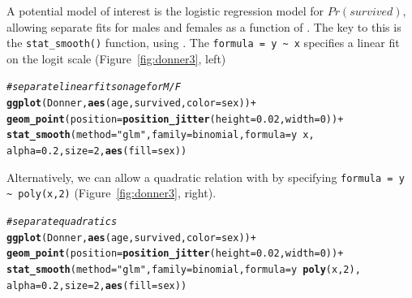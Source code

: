 \documentclass[10pt,twoside]{article}\usepackage[]{graphicx}\usepackage[]{color}
\makeatletter
\newcommand{\hlnum}[1]{\textcolor[rgb]{0.686,0.059,0.569}{#1}}%
\newcommand{\hlstr}[1]{\textcolor[rgb]{0.192,0.494,0.8}{#1}}%
\newcommand{\hlcom}[1]{\textcolor[rgb]{0.678,0.584,0.686}{\textit{#1}}}%
\newcommand{\hlopt}[1]{\textcolor[rgb]{0,0,0}{#1}}%
\newcommand{\hlstd}[1]{\textcolor[rgb]{0.345,0.345,0.345}{#1}}%
\newcommand{\hlkwc}[1]{\textcolor[rgb]{0.333,0.667,0.333}{#1}}%
\newcommand{\hlkwd}[1]{\textcolor[rgb]{0.737,0.353,0.396}{\textbf{#1}}}%
\newenvironment{kframe}{%
 \def\at@end@of@kframe{}%
 \ifinner\ifhmode%
  \def\at@end@of@kframe{\end{minipage}}%
  \begin{minipage}{\columnwidth}%
 \fi\fi%
 \def\FrameCommand##1{\hskip\@totalleftmargin \hskip-\fboxsep
 \colorbox{shadecolor}{##1}\hskip-\fboxsep
     \hskip-\linewidth \hskip-\@totalleftmargin \hskip\columnwidth}%
 \MakeFramed {\advance\hsize-\width
   \@totalleftmargin\z@ \linewidth\hsize
   \@setminipage}}%
 {\par\unskip\endMakeFramed%
 \at@end@of@kframe}
\newenvironment{knitrout}{}{} %
\newcommand{\figref}[1]{Figure~\ref{#1}}
\makeatother
\begin{document}
A potential model of interest
is the logistic regression model for $Pr(survived)$, allowing separate
fits for males and females as a function of .
The key to this is the \verb|stat_smooth()| function, using
	. The \verb|formula = y ~ x|
	specifies a linear fit on the logit scale (\figref{fig:donner3}, left)

\begin{knitrout}
\color{fgcolor}\begin{kframe}
\begin{alltt}
\hlcom{# separate linear fits on age for M/F}
\hlkwd{ggplot}\hlstd{(Donner,} \hlkwd{aes}\hlstd{(age, survived,} \hlkwc{color} \hlstd{= sex))} \hlopt{+}
  \hlkwd{geom_point}\hlstd{(}\hlkwc{position} \hlstd{=} \hlkwd{position_jitter}\hlstd{(}\hlkwc{height} \hlstd{=} \hlnum{0.02}\hlstd{,} \hlkwc{width} \hlstd{=} \hlnum{0}\hlstd{))} \hlopt{+}
  \hlkwd{stat_smooth}\hlstd{(}\hlkwc{method} \hlstd{=} \hlstr{"glm"}\hlstd{,} \hlkwc{family} \hlstd{= binomial,} \hlkwc{formula} \hlstd{= y} \hlopt{~} \hlstd{x,}
           \hlkwc{alpha} \hlstd{=} \hlnum{0.2}\hlstd{,} \hlkwc{size}\hlstd{=}\hlnum{2}\hlstd{,} \hlkwd{aes}\hlstd{(}\hlkwc{fill} \hlstd{= sex))}
\end{alltt}
\end{kframe}
\end{knitrout}

Alternatively, we can allow a quadratic relation with 
by specifying \verb|formula = y ~ poly(x,2)| (\figref{fig:donner3}, right).
\begin{knitrout}
\color{fgcolor}\begin{kframe}
\begin{alltt}
\hlcom{# separate quadratics}
\hlkwd{ggplot}\hlstd{(Donner,} \hlkwd{aes}\hlstd{(age, survived,} \hlkwc{color} \hlstd{= sex))} \hlopt{+}
  \hlkwd{geom_point}\hlstd{(}\hlkwc{position} \hlstd{=} \hlkwd{position_jitter}\hlstd{(}\hlkwc{height} \hlstd{=} \hlnum{0.02}\hlstd{,} \hlkwc{width} \hlstd{=} \hlnum{0}\hlstd{))} \hlopt{+}
  \hlkwd{stat_smooth}\hlstd{(}\hlkwc{method} \hlstd{=} \hlstr{"glm"}\hlstd{,} \hlkwc{family} \hlstd{= binomial,} \hlkwc{formula} \hlstd{= y} \hlopt{~} \hlkwd{poly}\hlstd{(x,}\hlnum{2}\hlstd{),}
           \hlkwc{alpha} \hlstd{=} \hlnum{0.2}\hlstd{,} \hlkwc{size}\hlstd{=}\hlnum{2}\hlstd{,} \hlkwd{aes}\hlstd{(}\hlkwc{fill} \hlstd{= sex))}
\end{alltt}
\end{kframe}
\end{knitrout}
\end{document}
